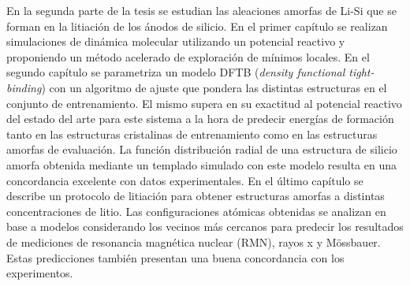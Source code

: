 En la segunda parte de la tesis se estudian las aleaciones amorfas de Li-Si que 
se forman en la litiación de los ánodos de silicio. En el primer capítulo se 
realizan simulaciones de dinámica molecular utilizando un potencial reactivo y 
proponiendo un método acelerado de exploración de mínimos locales. En el segundo 
capítulo se parametriza un modelo DFTB (\textit{density functional tight-binding})
con un algoritmo de ajuste que pondera las distintas estructuras en el conjunto 
de entrenamiento. El mismo supera en su exactitud al potencial reactivo del 
estado del arte para este sistema a la hora de predecir energías de formación 
tanto en las estructuras cristalinas de entrenamiento como en las estructuras 
amorfas de evaluación. La función distribución radial de una estructura de 
silicio amorfa obtenida mediante un templado simulado con este modelo resulta en 
una concordancia excelente con datos experimentales. En el último capítulo se 
describe un protocolo de litiación para obtener estructuras amorfas a distintas 
concentraciones de litio. Las configuraciones atómicas obtenidas se analizan en base a 
modelos considerando los vecinos más cercanos para predecir los resultados de mediciones de resonancia magnética nuclear (RMN), 
rayos x y Mössbauer. Estas predicciones también presentan una buena concordancia 
con los experimentos.
